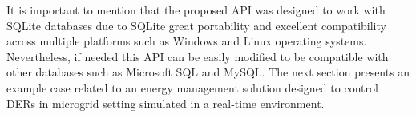 It is important to mention that the proposed API was designed to work with SQLite databases due to SQLite great portability and excellent compatibility across multiple platforms such as Windows and Linux operating systems. Nevertheless, if needed this API can be easily modified to be compatible with other databases such as Microsoft SQL and MySQL. The next section presents an example case related to an energy management solution designed to control DERs in microgrid setting simulated in a real-time environment.



 